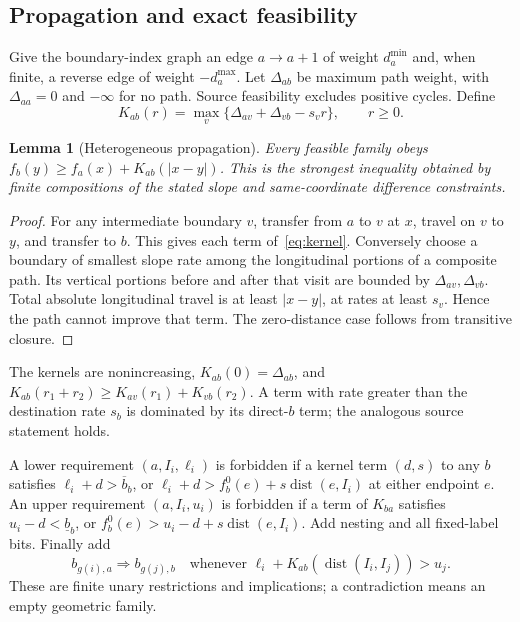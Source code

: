\documentclass[10pt,letterpaper]{article}
\newtheorem{lemma}[theorem]{Lemma}
\newcommand{\dist}{\operatorname{dist}}
\begin{document}
\subsection{Propagation and exact feasibility}
Give the boundary-index graph an edge $a\to a+1$ of weight $d_a^{\min}$ and, when finite, a reverse edge of weight $-d_a^{\max}$. Let $\Delta_{ab}$ be maximum path weight, with $\Delta_{aa}=0$ and $-\infty$ for no path. Source feasibility excludes positive cycles. Define
\begin{equation}
K_{ab}(r)=\max_v\{\Delta_{av}+\Delta_{vb}-s_v r\},\qquad r\ge0.\label{eq:kernel}
\end{equation}
\begin{lemma}[Heterogeneous propagation]\label{lem:kernel}
Every feasible family obeys $f_b(y)\ge f_a(x)+K_{ab}(|x-y|)$. This is the strongest inequality obtained by finite compositions of the stated slope and same-coordinate difference constraints.
\end{lemma}
\begin{proof}
For any intermediate boundary $v$, transfer from $a$ to $v$ at $x$, travel on $v$ to $y$, and transfer to $b$. This gives each term of~\eqref{eq:kernel}. Conversely choose a boundary of smallest slope rate among the longitudinal portions of a composite path. Its vertical portions before and after that visit are bounded by $\Delta_{av},\Delta_{vb}$. Total absolute longitudinal travel is at least $|x-y|$, at rates at least $s_v$. Hence the path cannot improve that term. The zero-distance case follows from transitive closure.
\end{proof}
The kernels are nonincreasing, $K_{ab}(0)=\Delta_{ab}$, and $K_{ab}(r_1+r_2)\ge K_{av}(r_1)+K_{vb}(r_2)$. A term with rate greater than the destination rate $s_b$ is dominated by its direct-$b$ term; the analogous source statement holds.

A lower requirement $(a,I_i,\ell_i)$ is forbidden if a kernel term $(d,s)$ to any $b$ satisfies $\ell_i+d>\overline b_b$, or $\ell_i+d>f_b^0(e)+s\dist(e,I_i)$ at either endpoint $e$. An upper requirement $(a,I_i,u_i)$ is forbidden if a term of $K_{ba}$ satisfies $u_i-d<\underline b_b$, or $f_b^0(e)>u_i-d+s\dist(e,I_i)$. Add nesting and all fixed-label bits. Finally add
\begin{equation}
b_{g(i),a}\Rightarrow b_{g(j),b}
\quad\text{whenever }\ell_i+K_{ab}(\dist(I_i,I_j))>u_j.\label{eq:imp}
\end{equation}
These are finite unary restrictions and implications; a contradiction means an empty geometric family.
\end{document}
